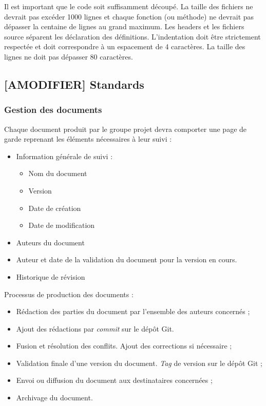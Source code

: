 \documentclass[10pt,a4paper]{article}
\begin{document}
Il est important que le code soit suffisamment découpé. La taille des fichiers ne devrait pas excéder 1000 lignes et chaque fonction (ou méthode) ne devrait pas dépasser la centaine de lignes au grand maximum. Les headers et les fichiers source séparent les déclaration des définitions.
L'indentation doit être strictement respectée et doit correspondre à un espacement de 4 caractères.
La taille des lignes ne doit pas dépasser 80 caractères.

\subsection{[AMODIFIER] Standards}

\subsubsection{Gestion des documents}

Chaque document produit par le groupe projet devra comporter une page de garde reprenant les éléments nécessaires à leur suivi :
\begin{itemize}
\item Information générale de suivi :
\begin{itemize} 
	\renewcommand{\labelitemii}{$\cdot$}
	\item Nom du document
	\item Version
	\item Date de création
	\item Date de modification
\end{itemize}
\item Auteurs du document
\item Auteur et date de la validation du document pour la version en cours.
\item Historique de révision
\end{itemize}

\noindent Processus de production des documents :
\begin{itemize}
\item Rédaction des parties du document par l'ensemble des auteurs concernés ;
\item Ajout des rédactions par \textit{commit} sur le dépôt Git. 
\item Fusion et résolution des conflits. Ajout des corrections si nécessaire ;
\item Validation finale d'une version du document. \textit{Tag} de version sur le dépôt Git ;
\item Envoi ou diffusion du document aux destinataires concernées ;
\item Archivage du document.
\end{itemize}
\end{document}

